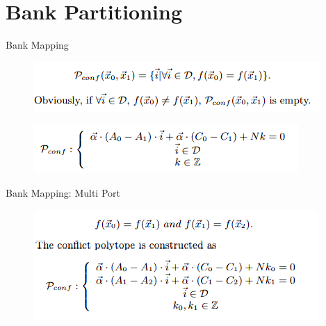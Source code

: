 \documentclass[xcolor=dvipsnames]{beamer}
\begin{document}
    \section{Bank Partitioning}
    \begin{frame}{Bank Mapping}

        \begin{figure}
            \includegraphics{BankMap.PNG}
        \end{figure}

        \begin{figure}
            \includegraphics{BankMapCyclic.PNG}
        \end{figure}
        
    \end{frame}

    \begin{frame}{Bank Mapping: Multi Port}

        \begin{figure}
            \includegraphics{MultiPortExtn.PNG}
        \end{figure}
        
    \end{frame}
\end{document}

